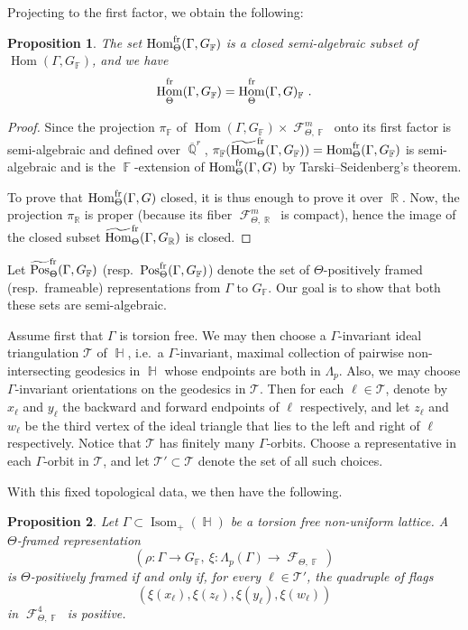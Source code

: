 \documentclass{amsart}
\theoremstyle{plain}
\newtheorem{proposition}{Proposition}[section]
\theoremstyle{definition}
\DeclareMathOperator{\Hom}{Hom}
\DeclareMathOperator{\Isom}{Isom}
\DeclareMathOperator{\Pos}{Pos}
\DeclareMathOperator{\Fc}{\mathcal{F}}
\DeclareMathOperator{\Fb}{{\mathbb{F}}}
\DeclareMathOperator{\Hb}{\mathbb{H}}
\DeclareMathOperator{\Rb}{{\mathbb{R}}}
\DeclareMathOperator{\Qb}{\mathbb{Q}}
\newcommand{\fr}{\textnormal{fr}}
\newcommand{\Qbar}{\overline{\Qb}^r}
\newcommand{\1}{\mathbf{1}}
\begin{document}
Projecting to the first factor, we obtain the following:
\begin{proposition}
    The set $\Hom_\Theta^{\fr}(\Gamma,G_{\Fb})$ is a closed semi-algebraic subset of\break $\Hom(\Gamma,G_{\Fb})$, and we have
    \[\Hom_\Theta^{\fr}(\Gamma,G_{\Fb}) = \Hom_\Theta^{\fr}(\Gamma,G)_{\Fb}~.\]
\end{proposition}
\begin{proof}
Since the projection $\pi_{\Fb}$ of $\Hom(\Gamma,G_{\Fb})\times \Fc_{\Theta,\Fb}^m$ onto its first factor is semi-algebraic and defined over $\Qbar$, $\pi_{\Fb}(\widetilde{\Hom}_\Theta^{\fr}(\Gamma,G_{\Fb})) = \Hom_\Theta^{\fr}(\Gamma,G_{\Fb})$ is semi-algebraic and is the $\Fb$-extension of $\Hom_\Theta^{\fr}(\Gamma,G)$ by Tarski--Seidenberg's theorem.

To prove that $\Hom_\Theta^{\fr}(\Gamma,G)$ closed, it is thus enough to prove it over $\Rb$. Now, the projection $\pi_{\Rb}$ is proper (because its fiber $\Fc_{\Theta,\Rb}^m$ is compact), hence the image of the closed subset $\widetilde{\Hom}_\Theta^{\fr}(\Gamma,G_{\Rb})$ is closed.
\end{proof} 


Let $\widetilde{\Pos}_\Theta^{\fr}(\Gamma,G_{\Fb})$ (resp.\ $\Pos_\Theta^{\fr}(\Gamma,G_{\Fb})$) denote the set of $\Theta$-positively framed (resp.\ frameable) representations from $\Gamma$ to $G_{\Fb}$. Our goal is to show that both these sets are semi-algebraic.

Assume first that $\Gamma$ is torsion free. We may then choose a $\Gamma$-invariant ideal triangulation $\mathcal T$ of $\Hb$, i.e.\ a $\Gamma$-invariant, maximal collection of pairwise non-intersecting geodesics in $\Hb$ whose endpoints are both in $\Lambda_p$.
Also, we may choose $\Gamma$-invariant orientations on the geodesics in $\mathcal T$. Then for each $\ell\in\mathcal T$,
denote by $x_\ell$ and $y_\ell$ the backward and forward endpoints of $\ell$ respectively, and let $z_\ell$ and $w_\ell$ be the third vertex of the ideal triangle that lies to the left and right of $\ell$ respectively. Notice that $\mathcal T$ has finitely many $\Gamma$-orbits.
Choose a representative in each $\Gamma$-orbit in $\mathcal T$, and let $\mathcal T'\subset\mathcal T$ denote the set of all such choices.

With this fixed topological data, we then have the following.

\begin{proposition}
\label{propo: ThetaPosSemiAlg}
Let $\Gamma\subset \Isom_+(\Hb)$ be a torsion free non-uniform lattice. A $\Theta$-framed representation 
\[(\rho \colon \Gamma\to G_{\Fb},\ \xi \colon \Lambda_p(\Gamma)\to\Fc_{\Theta,\Fb})\]
is $\Theta$-positively framed if and only if, for every $\ell\in\mathcal T'$, the quadruple of flags
\[(\xi(x_\ell),\xi(z_\ell),\xi(y_\ell),\xi(w_\ell))\]
in $\Fc_{\Theta,\Fb}^4$ is positive. 
\end{proposition}
\end{document}
